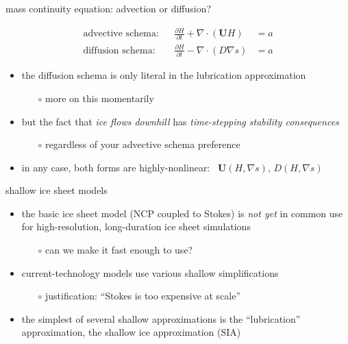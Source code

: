\documentclass[svgnames,
               hyperref={colorlinks,citecolor=DeepPink4,linkcolor=FireBrick,urlcolor=Maroon},
               usepdftitle=false]  %
               {beamer}
\newcommand{\grad}{\nabla}
\newcommand{\bU}{\mathbf{U}}
\begin{document}
\begin{frame}{mass continuity equation: advection or diffusion?}

\begin{align*}
\text{advective schema:} && \frac{\partial H}{\partial t} + \nabla \cdot \left(\bU H\right) &= a \\
\text{diffusion schema:} && \frac{\partial H}{\partial t} - \nabla \cdot \left(D \grad s\right) &= a
\end{align*}
\begin{itemize}
\item the diffusion schema is only literal in the lubrication approximation
    \begin{itemize}
    \item[$\circ$] more on this momentarily
    \end{itemize}
\item but the fact that \emph{ice flows downhill} has \emph{time-stepping stability consequences}
    \begin{itemize}
    \item[$\circ$] regardless of your advective schema preference
    \end{itemize}
\item in any case, both forms are highly-nonlinear: \, $\bU(H,\grad s), \, D(H,\grad s)$
\end{itemize}
\end{frame}


\begin{frame}{shallow ice sheet models}

\begin{itemize}
\item the basic ice sheet model (NCP coupled to Stokes) is \emph{not yet} in common use for high-resolution, long-duration ice sheet simulations
    \begin{itemize}
    \item[$\circ$] \alert{can we make it fast enough to use?}
    \end{itemize}

\smallskip
\item current-technology models use various shallow simplifications
    \begin{itemize}
    \item[$\circ$] justification: ``Stokes is too expensive at scale''
    \end{itemize}
\item the simplest of several shallow approximations is the ``lubrication'' approximation, the \alert{shallow ice approximation} (SIA)

\smallskip
\end{itemize}
\end{frame}
\end{document}
